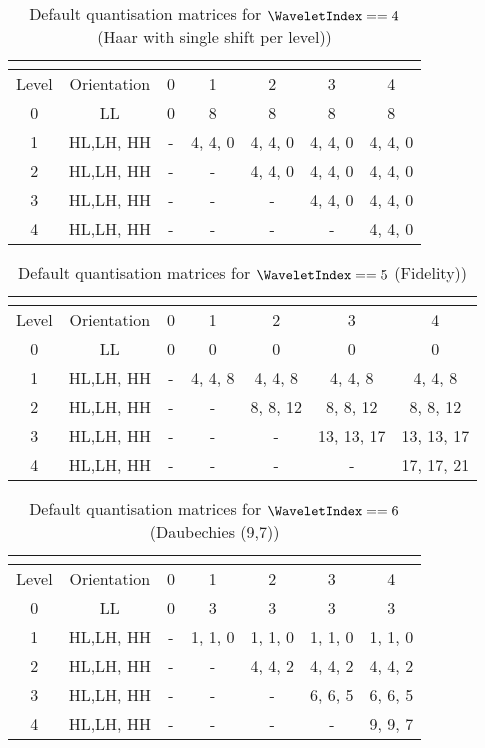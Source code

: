 \begin{table}[!ht]
\centering
\begin{tabular}{|c|c|c|c|c|c|c|}
\hline
\multicolumn{2}{|c|}{\cellcolor[gray]{0.75}}& \multicolumn{5}{|c|}{\cellcolor[gray]{0.75}{$\TransformDepth$}} \\
\hline
Level & Orientation & 0 & 1 & 2 & 3 & 4 \\
\hline
0 & LL & 0 & 8 & 8 & 8 & 8\\
\hline
1 & HL,LH, HH & - & 4, 4, 0 & 4, 4, 0 & 4, 4, 0 & 4, 4, 0  \\
\hline
2 & HL,LH, HH & - & - & 4, 4, 0 & 4, 4, 0 & 4, 4, 0  \\
\hline
3 & HL,LH, HH & - & - & - & 4, 4, 0 & 4, 4, 0  \\
\hline
4 & HL,LH, HH & - & - & - & - & 4, 4, 0  \\
\hline
\end{tabular}
\caption{Default quantisation matrices for $\WaveletIndex==4$ (Haar with single shift per level)) 
\label{table:qm4}}
\end{table}

\begin{table}[!ht]
\centering
\begin{tabular}{|c|c|c|c|c|c|c|}
\hline
\multicolumn{2}{|c|}{\cellcolor[gray]{0.75}}& \multicolumn{5}{|c|}{\cellcolor[gray]{0.75}{$\TransformDepth$}} \\
\hline
Level & Orientation & 0 & 1 & 2 & 3 & 4 \\
\hline
0 & LL & 0 & 0 & 0 & 0 & 0\\
\hline
1 & HL,LH, HH & - & 4, 4, 8 & 4, 4, 8 & 4, 4, 8 & 4, 4, 8  \\
\hline
2 & HL,LH, HH & - & - & 8, 8, 12 & 8, 8, 12 & 8, 8, 12  \\
\hline
3 & HL,LH, HH & - & - & - & 13, 13, 17 & 13, 13, 17  \\
\hline
4 & HL,LH, HH & - & - & - & - & 17, 17, 21  \\
\hline
\end{tabular}
\caption{Default quantisation matrices for $\WaveletIndex==5$ (Fidelity)) 
\label{table:qm6}}
\end{table}

\begin{table}[!ht]
\centering
\begin{tabular}{|c|c|c|c|c|c|c|}
\hline
\multicolumn{2}{|c|}{\cellcolor[gray]{0.75}}& \multicolumn{5}{|c|}{\cellcolor[gray]{0.75}{$\TransformDepth$}} \\
\hline
Level & Orientation & 0 & 1 & 2 & 3 & 4 \\
\hline
0 & LL & 0 & 3 & 3 & 3 & 3\\
\hline
1 & HL,LH, HH & - & 1, 1, 0 & 1, 1, 0 & 1, 1, 0 & 1, 1, 0  \\
\hline
2 & HL,LH, HH & - & - & 4, 4, 2 & 4, 4, 2 & 4, 4, 2  \\
\hline
3 & HL,LH, HH & - & - & - & 6, 6, 5 & 6, 6, 5  \\
\hline
4 & HL,LH, HH & - & - & - & - & 9, 9, 7  \\
\hline
\end{tabular}
\caption{Default quantisation matrices for $\WaveletIndex==6$ (Daubechies (9,7))
\label{table:qm7}}
\end{table}

